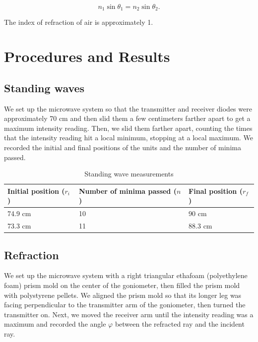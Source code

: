 \documentclass[11pt, titlepage, letterpaper, twoside]{article}
\begin{document}
\begin{equation}
  n_1 \sin \theta_1 = n_2 \sin \theta_2.
\end{equation}

The index of refraction of air is approximately 1.

\section{Procedures and Results}

\subsection{Standing waves}

We set up the microwave system so that the transmitter and receiver diodes were approximately 70 cm and then slid them
a few centimeters farther apart to get a maximum intensity reading. Then, we slid them farther apart, counting the
times that the intensity reading hit a local minimum, stopping at a local maximum. We recorded the initial and final
positions of the units and the number of minima passed.

\begin{table}[h!]
\centering
\caption{Standing wave measurements}
\label{stwav}
\begin{tabular}{|l|l|l|}
\hline
Initial position ($r_i$) & Number of minima passed ($n$) & Final position ($r_f$) \\ \hline
74.9 cm                  & 10                            & 90 cm                  \\ \hline
73.3 cm                  & 11                            & 88.3 cm                \\ \hline
\end{tabular}
\end{table}

\subsection{Refraction}

We set up the microwave system with a right triangular ethafoam (polyethylene foam) prism mold on the center of the goniometer, then
filled the prism mold with polystyrene pellets. We aligned the prism mold so that its longer leg was facing perpendicular to the
transmitter arm of the goniometer, then turned the transmitter on. Next, we moved the receiver arm until the intensity reading was
a maximum and recorded the angle $\varphi$ between the refracted ray and the incident ray.
\end{document}
